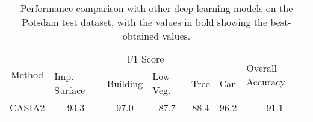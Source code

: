 \documentclass[journal]{IEEEtran}
\begin{document}
\begin{table*}[h!]
\renewcommand{\arraystretch}{1.25}
\centering
\caption{Performance comparison with other deep learning models on the Potsdam test dataset, with the values in bold showing the best-obtained values.}
\begin{tabular}{lcccccc} 
\hline
\multicolumn{1}{c}{\multirow{2}{*}{Method}} & \multicolumn{5}{c}{F1 Score}  & \multicolumn{1}{l}{\multirow{2}{*}{Overall Accuracy}} \\ 
\cline{2-6}
\multicolumn{1}{c}{}  & \multicolumn{1}{l}{Imp. Surface} & \multicolumn{1}{l}{Building} & \multicolumn{1}{l}{Low Veg.} & \multicolumn{1}{l}{Tree} & \multicolumn{1}{l}{Car} & \multicolumn{1}{l}{}                                     \\ 
\hline
CASIA2 \cite{LIU201878}    
&93.3                     & 97.0                 & 87.7                   & 88.4             & 96.2            & 91.1       \\


\end{tabular}
\end{table*}
\end{document}
